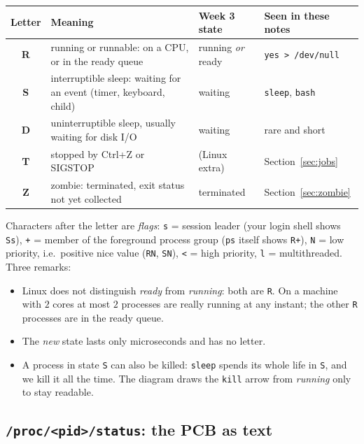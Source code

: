\documentclass[11pt,a4paper]{article}
\newcommand{\cmd}[1]{\texttt{#1}}
\begin{document}
\begin{center}
\renewcommand{\arraystretch}{1.25}
\begin{tabularx}{\linewidth}{>{\ttfamily\bfseries}c >{\raggedright\arraybackslash}X >{\raggedright\arraybackslash}p{3.0cm} >{\raggedright\arraybackslash}p{3.2cm}}
\toprule
\textbf{\rmfamily Letter} & \textbf{Meaning} & \textbf{Week 3 state} & \textbf{Seen in these notes}\\
\midrule
R & running or runnable: on a CPU, or in the ready queue & running \emph{or} ready & \cmd{yes > /dev/null}\\
S & interruptible sleep: waiting for an event (timer, keyboard, child) & waiting & \cmd{sleep}, \cmd{bash}\\
D & uninterruptible sleep, usually waiting for disk I/O & waiting & rare and short\\
T & stopped by Ctrl+Z or SIGSTOP & (Linux extra) & Section~\ref{sec:jobs}\\
Z & zombie: terminated, exit status not yet collected & terminated & Section~\ref{sec:zombie}\\
\bottomrule
\end{tabularx}
\end{center}

Characters after the letter are \emph{flags}: \texttt{s} = session leader (your login shell shows \texttt{Ss}), \texttt{+} = member of the foreground process group (\cmd{ps} itself shows \texttt{R+}), \texttt{N} = low priority, i.e.\ positive nice value (\texttt{RN}, \texttt{SN}), \texttt{<} = high priority, \texttt{l} = multithreaded. Three remarks:
\begin{itemize}
  \item Linux does not distinguish \emph{ready} from \emph{running}: both are \texttt{R}. On a machine with $2$ cores at most $2$ processes are really running at any instant; the other \texttt{R} processes are in the ready queue.
  \item The \emph{new} state lasts only microseconds and has no letter.
  \item A process in state \texttt{S} can also be killed: \cmd{sleep} spends its whole life in \texttt{S}, and we kill it all the time. The diagram draws the \cmd{kill} arrow from \emph{running} only to stay readable.
\end{itemize}

\subsection{\texttt{/proc/<pid>/status}: the PCB as text}
\label{sec:proc}
\end{document}
